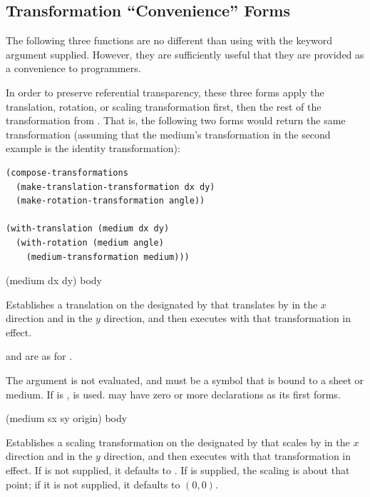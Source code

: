 \subsection {Transformation ``Convenience'' Forms}

The following three functions are no different than using
 with the  keyword argument
supplied.  However, they are sufficiently useful that they are provided as a
convenience to programmers.

In order to preserve referential transparency, these three forms apply the
translation, rotation, or scaling transformation first, then the rest of the
transformation from .  That is, the
following two forms would return the same transformation (assuming that the
medium's transformation in the second example is the identity transformation):

\begin{verbatim}
(compose-transformations
  (make-translation-transformation dx dy)
  (make-rotation-transformation angle))

(with-translation (medium dx dy)
  (with-rotation (medium angle)
    (medium-transformation medium)))
\end{verbatim}

 {(medium dx dy) \body body}

Establishes a translation on the  designated by  that
translates by  in the $x$ direction and  in the $y$ direction,
and then executes  with that transformation in effect.

 and  are as for .

The  argument is not evaluated, and must be a symbol that is bound
to a sheet or medium.  If  is ,  is
used.   may have zero or more declarations as its first forms.

 {(medium sx \optional sy origin) \body body}

Establishes a scaling transformation on the  designated by
 that scales by  in the $x$ direction and  in the
$y$ direction, and then executes  with that transformation in effect.
If  is not supplied, it defaults to .  If  is
supplied, the scaling is about that point; if it is not supplied, it defaults to
$(0,0)$.

